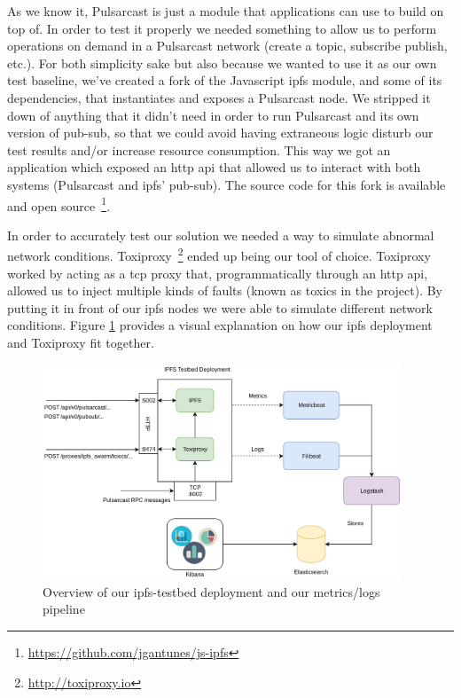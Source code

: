 As we know it, Pulsarcast is just a module that applications can use to build
on top of. In order to test it properly we needed something to allow us to
perform operations on demand in a Pulsarcast network (create a topic, subscribe
publish, etc.). For both simplicity sake but also because we wanted to use it
as our own test baseline, we've created a fork of the Javascript
\acrshort{ipfs} module, and some of its dependencies, that instantiates and
exposes a Pulsarcast node.  We stripped it down of anything that it didn't need
in order to run Pulsarcast and its own version of pub-sub, so that we could
avoid having extraneous logic disturb our test results and/or increase resource
consumption. This way we got an application which exposed an \acrshort{http}
\acrshort{api} that allowed us to interact with both systems (Pulsarcast and
\acrshort{ipfs}' pub-sub). The source code for this fork is available and open
source~\footnote{\url{https://github.com/jgantunes/js-ipfs}}.

In order to accurately test our solution we needed a way to simulate abnormal
network conditions. Toxiproxy~\footnote{\url{http://toxiproxy.io}} ended up being our
tool of choice. Toxiproxy worked by acting as a \acrshort{tcp} proxy that,
programmatically through an \acrshort{http} \acrshort{api}, allowed us to
inject multiple kinds of faults (known as toxics in the project). By putting it
in front of our \acrshort{ipfs} nodes we were able to simulate different
network conditions.  Figure \ref{fig:ipfs-testbed-and-metrics} provides a
visual explanation on how our \acrshort{ipfs} deployment and Toxiproxy fit
together.

\begin{figure}[!htb]
  \centering
  \includegraphics[width=0.95\textwidth]{../images/ipfs-testbed-and-metrics.png}
  \caption{Overview of our ipfs-testbed deployment and our metrics/logs
  pipeline}
  \label{fig:ipfs-testbed-and-metrics}
\end{figure}

